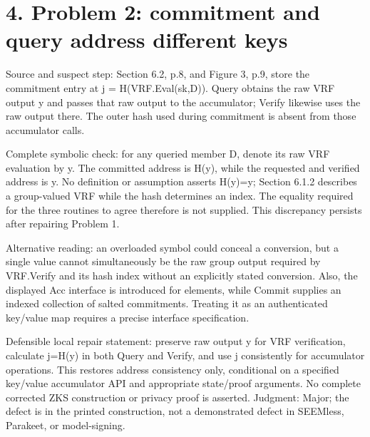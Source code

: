 \documentclass[10pt]{article}
\begin{document}
\section*{4. Problem 2: commitment and query address different keys}
Source and suspect step: Section 6.2, p.8, and Figure 3, p.9, store the commitment entry at j = H(VRF.Eval(sk,D)). Query obtains the raw VRF output y and passes that raw output to the accumulator; Verify likewise uses the raw output there. The outer hash used during commitment is absent from those accumulator calls.\par
Complete symbolic check: for any queried member D, denote its raw VRF evaluation by y. The committed address is H(y), while the requested and verified address is y. No definition or assumption asserts H(y)=y; Section 6.1.2 describes a group-valued VRF while the hash determines an index. The equality required for the three routines to agree therefore is not supplied. This discrepancy persists after repairing Problem 1.\par
Alternative reading: an overloaded symbol could conceal a conversion, but a single value cannot simultaneously be the raw group output required by VRF.Verify and its hash index without an explicitly stated conversion. Also, the displayed Acc interface is introduced for elements, while Commit supplies an indexed collection of salted commitments. Treating it as an authenticated key/value map requires a precise interface specification.\par
Defensible local repair statement: preserve raw output y for VRF verification, calculate j=H(y) in both Query and Verify, and use j consistently for accumulator operations. This restores address consistency only, conditional on a specified key/value accumulator API and appropriate state/proof arguments. No complete corrected ZKS construction or privacy proof is asserted. Judgment: Major; the defect is in the printed construction, not a demonstrated defect in SEEMless, Parakeet, or model-signing.\par
\end{document}
